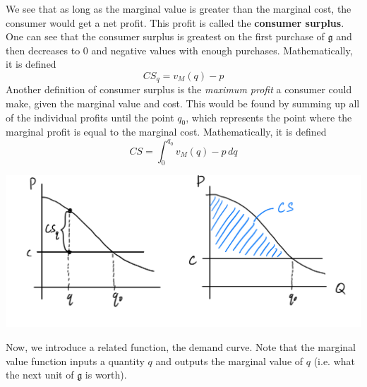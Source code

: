 \documentclass{article}
\begin{document}
    \begin{definition}
      We see that as long as the marginal value is greater than the marginal cost, the consumer would get a net profit. This profit is called the \textbf{consumer surplus}. One can see that the consumer surplus is greatest on the first purchase of $\mathfrak{g}$ and then decreases to $0$ and negative values with enough purchases. Mathematically, it is defined 
      \[CS_{q} = v_M (q) - p\]
      Another definition of consumer surplus is the \textit{maximum profit} a consumer could make, given the marginal value and cost. This would be found by summing up all of the individual profits until the point $q_0$, which represents the point where the marginal profit is equal to the marginal cost. Mathematically, it is defined 
      \[CS = \int_{0}^{q_0} v_M (q) - p \,dq\]
      \begin{center}
        \includegraphics[scale=0.25]{img/Consumer_Surplus_Definition.PNG}
      \end{center}
    \end{definition}

    Now, we introduce a related function, the demand curve. Note that the marginal value function inputs a quantity $q$ and outputs the marginal value of $q$ (i.e. what the next unit of $\mathfrak{g}$ is worth).
\end{document}
